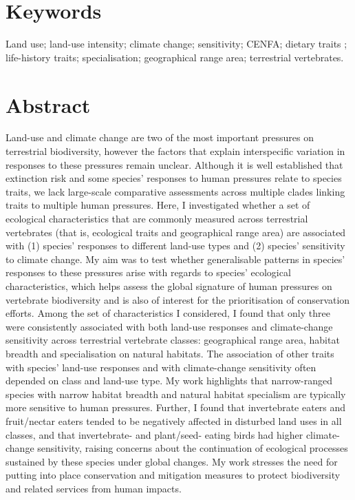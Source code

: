 
\section*{Keywords}
Land use; land-use intensity; climate change; sensitivity; CENFA; dietary traits ; life-history traits; specialisation; geographical range area; terrestrial vertebrates.

\section*{Abstract}
Land-use and climate change are two of the most important pressures on terrestrial biodiversity, however the factors that explain interspecific variation in responses to these pressures remain unclear. Although it is well established that extinction risk and some species' responses to human pressures relate to species traits, we lack large-scale comparative assessments across multiple clades linking traits to multiple human pressures. Here, I investigated whether a set of ecological characteristics that are commonly measured across terrestrial vertebrates (that is, ecological traits and geographical range area) are associated with (1) species' responses to different land-use types and (2) species' sensitivity to climate change. My aim was to test whether generalisable patterns in species' responses to these pressures arise with regards to species' ecological characteristics, which helps assess the global signature of human pressures on vertebrate biodiversity and is also of interest for the prioritisation of conservation efforts. Among the set of characteristics I considered, I found that only three were consistently associated with both land-use responses and climate-change sensitivity across terrestrial vertebrate classes: geographical range area, habitat breadth and specialisation on natural habitats. The association  of other traits with species' land-use responses and with climate-change sensitivity often depended on class and land-use type. My work highlights that narrow-ranged species with narrow habitat breadth and natural habitat specialism are typically more sensitive to human pressures. Further, I found that invertebrate eaters and fruit/nectar eaters tended to be negatively affected in disturbed land uses in all classes, and that invertebrate- and plant/seed- eating birds had higher climate-change sensitivity, raising concerns about the continuation of ecological processes sustained by these species under global changes. My work stresses the need for putting into place conservation and mitigation measures to protect biodiversity and related services from human impacts.  

